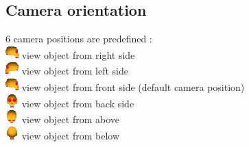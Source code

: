\subsection{Camera orientation}
6 camera positions are predefined :\\
\includegraphics[scale=0.7]{images/pixmap/right2.png} view object from right side \\
\includegraphics[scale=0.7]{images/pixmap/left2.png} view object from left side\\
\includegraphics[scale=0.7]{images/pixmap/right2.png} view object from front side (default camera position)\\
\includegraphics[scale=0.7]{images/pixmap/front2.png} view object from back side\\
\includegraphics[scale=0.7]{images/pixmap/above2.png} view object from above\\
\includegraphics[scale=0.7]{images/pixmap/back2.png} view object from below\\

